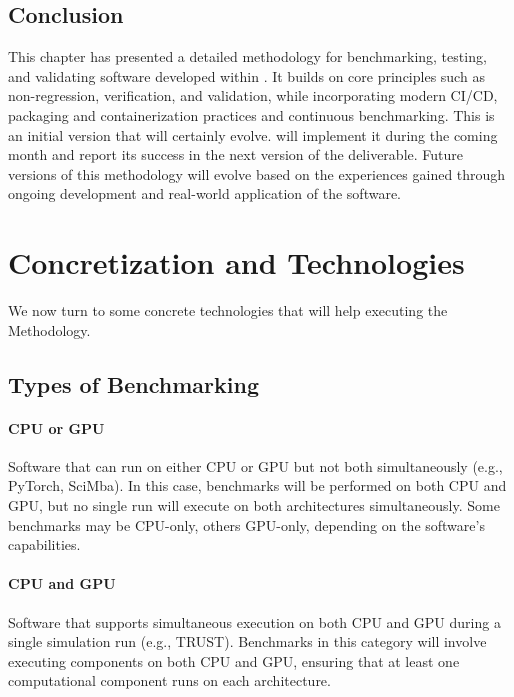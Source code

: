 \subsection{Conclusion}
\label{sec:methodology-conclusion}

This chapter has presented a detailed methodology for benchmarking, testing, and validating software developed within \exama. It builds on core principles such as non-regression, verification, and validation, while incorporating modern CI/CD, packaging and containerization practices and continuous benchmarking. 
This is an initial version that will certainly evolve. 
\exama will implement it during the coming month and report its success in the next version of the deliverable.
Future versions of this methodology will evolve based on the experiences gained through ongoing development and real-world application of the \exama software.

\section{Concretization and Technologies}
\label{sec:benchmark:technologies}

We now turn to some concrete technologies that will help executing the Methodology.

\subsection{Types of Benchmarking}
\label{sec:methodology-types}

\paragraph{CPU or GPU}
Software that can run on either CPU or GPU but not both simultaneously (e.g., PyTorch, SciMba). In this case, benchmarks will be performed on both CPU and GPU, but no single run will execute on both architectures simultaneously. Some benchmarks may be CPU-only, others GPU-only, depending on the software's capabilities.

\paragraph{CPU and GPU}
Software that supports simultaneous execution on both CPU and GPU during a single simulation run (e.g., TRUST). Benchmarks in this category will involve executing components on both CPU and GPU, ensuring that at least one computational component runs on each architecture.

